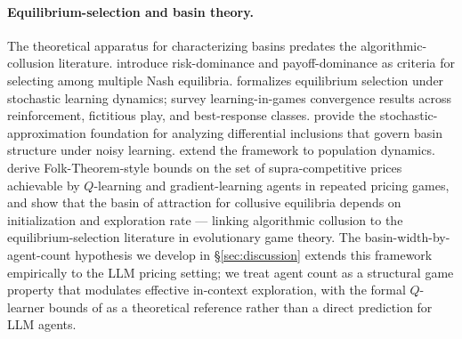 \paragraph{Equilibrium-selection and basin theory.}
The theoretical apparatus for characterizing basins predates the algorithmic-collusion literature. \citet{harsanyi_selten_1988_general_theory_equilibrium_selection} introduce risk-dominance and payoff-dominance as criteria for selecting among multiple Nash equilibria. \citet{young_1993_evolution_of_conventions} formalizes equilibrium selection under stochastic learning dynamics; \citet{fudenberg_levine_1998_learning_in_games} survey learning-in-games convergence results across reinforcement, fictitious play, and best-response classes. \citet{benaim_hofbauer_sorin_2005_stochastic_approximation_differential_inclusions} provide the stochastic-approximation foundation for analyzing differential inclusions that govern basin structure under noisy learning. \citet{sandholm_2010_population_games} extend the framework to population dynamics. \citet{askenazi2024bounds} derive Folk-Theorem-style bounds on the set of supra-competitive prices achievable by $Q$-learning and gradient-learning agents in repeated pricing games, and show that the basin of attraction for collusive equilibria depends on initialization and exploration rate --- linking algorithmic collusion to the equilibrium-selection literature in evolutionary game theory. The basin-width-by-agent-count hypothesis we develop in \S\ref{sec:discussion} extends this framework empirically to the LLM pricing setting; we treat agent count as a structural game property that modulates effective in-context exploration, with the formal $Q$-learner bounds of \citeauthor{askenazi2024bounds} as a theoretical reference rather than a direct prediction for LLM agents.

